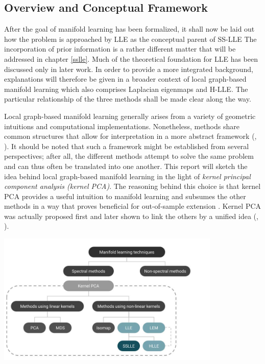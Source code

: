 \subsection{Overview and Conceptual Framework}
\label{principles-overview}

After the goal of manifold learning has been formalized, it shall now be laid 
out how the problem is approached by LLE as the conceptual parent of SS-LLE 
The incorporation of prior information is a rather different matter that will be 
addressed in chapter \ref{sslle}. 
Much of the theoretical foundation for LLE has been discussed only in later 
work.
In order to provide a more integrated background, explanations will therefore be 
given in a broader context of local graph-based manifold learning which also 
comprises Laplacian eigenmaps and H-LLE.
The particular relationship of the three methods shall be made clear along the 
way.

Local graph-based manifold learning generally arises from a variety 
of geometric intuitions and computational implementations.
Nonetheless, methods share common structures that allow for interpretation in a 
more abstract framework (\citet{bengioetal2003}, \citet{bengioetal2004}).
It should be noted that such a framework might be established from several 
perspectives; after all, the different methods attempt to solve the same problem 
and can thus often be translated into one another.
This report will sketch the idea behind local graph-based manifold learning in 
the light of \textit{kernel principal component analysis (kernel PCA)}.
The reasoning behind this choice is that kernel PCA provides a useful 
intuition to manifold learning and subsumes the other methods in a way that 
proves beneficial for out-of-sample extension \citep{bengioetal2004}.
Kernel PCA was actually proposed first and later shown to link the others by a 
unified idea (\citet{hametal2003}, \citet{bengioetal2004}). 

\begin{center}
  \includegraphics[width = 0.8\textwidth]{figures/models-overview}
\end{center}

